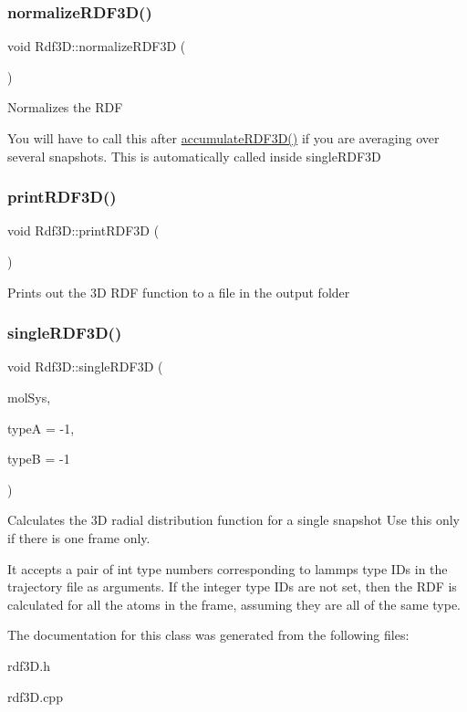 \subsubsection{\texorpdfstring{normalize\+R\+D\+F3\+D()}{normalizeRDF3D()}}
{\footnotesize\ttfamily void Rdf3\+D\+::normalize\+R\+D\+F3D (\begin{DoxyParamCaption}{ }\end{DoxyParamCaption})}

Normalizes the R\+DF

You will have to call this after \mbox{\hyperlink{classRdf3D_aca3e0b2da042856d705b4bca8f6be335}{accumulate\+R\+D\+F3\+D()}} if you are averaging over several snapshots. This is automatically called inside single\+R\+D\+F3D \mbox{\label{classRdf3D_a76fdc87564a586883c4f290fff3172b2}} 
\subsubsection{\texorpdfstring{print\+R\+D\+F3\+D()}{printRDF3D()}}
{\footnotesize\ttfamily void Rdf3\+D\+::print\+R\+D\+F3D (\begin{DoxyParamCaption}{ }\end{DoxyParamCaption})}

Prints out the 3D R\+DF function to a file in the output folder \mbox{\label{classRdf3D_a27efc547d859576b41a16d98cd2d1df9}} 
\subsubsection{\texorpdfstring{single\+R\+D\+F3\+D()}{singleRDF3D()}}
{\footnotesize\ttfamily void Rdf3\+D\+::single\+R\+D\+F3D (\begin{DoxyParamCaption}\item[{class \mbox{\hyperlink{classCMolecularSystem}{C\+Molecular\+System}} \&}]{mol\+Sys,  }\item[{int}]{typeA = {\ttfamily -\/1},  }\item[{int}]{typeB = {\ttfamily -\/1} }\end{DoxyParamCaption})}

Calculates the 3D radial distribution function for a single snapshot Use this only if there is one frame only.

It accepts a pair of int type numbers corresponding to lammps type I\+Ds in the trajectory file as arguments. If the integer type I\+Ds are not set, then the R\+DF is calculated for all the atoms in the frame, assuming they are all of the same type. 

The documentation for this class was generated from the following files\+:\begin{DoxyCompactItemize}
\item 
rdf3\+D.\+h\item 
rdf3\+D.\+cpp\end{DoxyCompactItemize}
